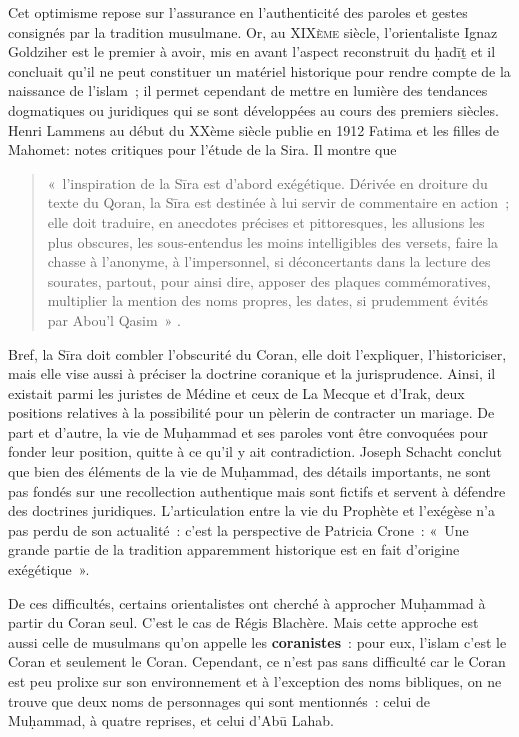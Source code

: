 Cet optimisme repose sur l'assurance en l'authenticité des paroles et
gestes consignés par la tradition musulmane. Or, au \textsc{XIXème}
siècle, l'orientaliste Ignaz Goldziher est le premier à avoir, mis en
avant l'aspect reconstruit du {ḥadīṯ} et il concluait qu'il ne peut
constituer un matériel historique pour rendre compte de la naissance de
l'islam~; il permet cependant de mettre en lumière des tendances
dogmatiques ou juridiques qui se sont développées au cours des premiers
siècles. Henri Lammens \label{Theol:Lammens2} au début du XXème siècle publie en 1912
{Fatima et les filles de Mahomet}: {notes critiques pour
l'étude de la Sira}. Il montre que

\begin{quote}
    «~l'inspiration de la Sīra est d'abord exégétique. Dérivée en droiture
du texte du Qoran, la Sīra est destinée à lui servir de commentaire en
action~; elle doit traduire, en anecdotes précises et pittoresques, les
allusions les plus obscures, les sous-entendus les moins intelligibles
des versets, faire la chasse à l'anonyme, à l'impersonnel, si
déconcertants dans la lecture des sourates, partout, pour ainsi dire,
apposer des plaques commémoratives, multiplier la mention des noms
propres, les dates, si prudemment évités par Abou'l Qasim~» \label{Lammens1} .
\end{quote}


Bref, la Sīra doit combler l'obscurité du Coran, elle doit l'expliquer,
l'historiciser, mais elle vise aussi à préciser la doctrine coranique et
la jurisprudence. Ainsi, il existait parmi les juristes de Médine et
ceux de La Mecque et d'Irak, deux positions relatives à la possibilité
pour un pèlerin de contracter un mariage. De part et d'autre, la vie de
Muḥammad et ses paroles vont être convoquées pour fonder leur position,
quitte à ce qu'il y ait contradiction. Joseph Schacht conclut que bien
des éléments de la vie de Muḥammad, des détails importants, ne sont pas
fondés sur une recollection authentique mais sont fictifs et servent à
défendre des doctrines juridiques. L'articulation entre la vie du
Prophète et l'exégèse n'a pas perdu de son actualité~: c'est la
perspective de Patricia Crone~: «~Une grande partie de la tradition
apparemment historique est en fait d'origine exégétique~».

De ces difficultés, certains orientalistes ont cherché à approcher
Muḥammad à partir du Coran seul. C'est le cas de Régis Blachère. Mais
cette approche est aussi celle de musulmans qu'on appelle les
\textbf{coranistes}~: pour eux, l'islam c'est le Coran et seulement le
Coran. Cependant, ce n'est pas sans difficulté car le Coran est peu
prolixe sur son environnement et à l'exception des noms bibliques, on ne
trouve que deux noms de personnages qui sont mentionnés~: celui de
Muḥammad, à quatre reprises, et celui d'Abū Lahab.


